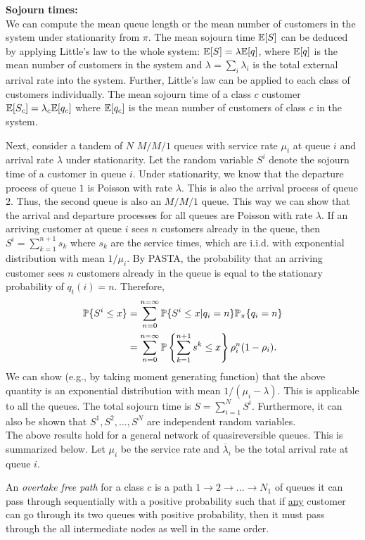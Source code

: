 \documentclass[all-lectures.tex]{subfiles}
\begin{document}
\noindent \textbf{Sojourn times:} \\
\indent We can compute the mean queue length or the mean number of customers in the system under stationarity from $\pi$. The mean sojourn time $\E[S]$ can be deduced by applying Little's law to the whole system: $\E[S] = \lambda \E[q]$, where $\E[q]$ is the mean number of customers in the system and $\lambda = \sum_i \lambda_i$ is the total external arrival rate into the system. Further, Little's law can be applied to each class of customers individually. The mean sojourn time of a class $c$ customer $\E[S_c] = \lambda_c \E[q_c]$ where $\E[q_c]$ is the mean number of customers of class $c$ in the system. 

\indent Next, consider a tandem of $N$ $M/M/1$ queues with service rate $\mu_i$ at queue $i$ and arrival rate $\lambda$ under stationarity. Let the random variable $S^i$ denote the sojourn time of a customer in queue $i$. Under stationarity, we know that the departure process of queue $1$ is Poisson with rate $\lambda$. This is also the arrival process of queue $2$. Thus, the second queue is also an $M/M/1$ queue. This way we can show that the arrival and departure processes for all queues are Poisson with rate $\lambda$. If an arriving customer at queue $i$ sees $n$ customers already in the queue, then $S^i = \sum_{k=1}^{n+1} s_k$ where $s_k$ are the service times, which are i.i.d. with exponential distribution with mean $1/\mu_i$. By PASTA, the probability that an arriving customer sees $n$ customers already in the queue is equal to the stationary probability of $q_t(i) = n$. Therefore,
\begin{align*}
\P\{S^i \leq x\} &= \sum_{n=0}^{n=\infty} \P\{S^i \leq x | q_i = n\} \P_{\pi}\{ q_i = n\} \\
&= \sum_{n=0}^{n=\infty} \P \left\{ \sum_{k=1}^{n+1}s^k \leq x \right\} \rho_i^n (1-\rho_i).
\end{align*}
We can show (e.g., by taking moment generating function) that the above quantity is an exponential distribution with mean $1/(\mu_i - \lambda)$. This is applicable to all the queues. The total sojourn time is $S = \sum_{i=1}^N S^i$. Furthermore, it can also be shown that $S^1,S^2,\dots,S^N$ are independent random variables. \\
\indent The above results hold for a general network of quasireversible queues. This is summarized below. Let $\mu_i$ be the service rate and $\overline{\lambda}_i$ be the total arrival rate at queue $i$.
\begin{defn}
An \textit{overtake free path }for a class $c$ is a path $1\to 2 \to ... \to N_1$ of queues it can pass through sequentially with a positive probability such that if \underline{any} customer can go through its two queues with positive probability, then it must pass through the all intermediate nodes as well in the same order.
\end{defn}
\end{document}
